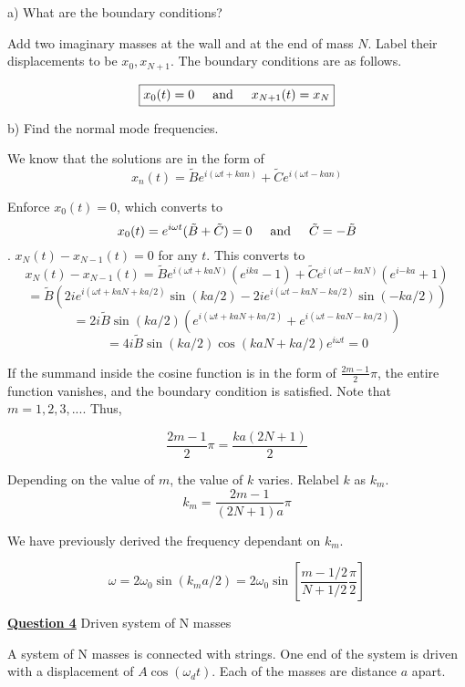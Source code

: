 \documentclass{article}
\newcommand{\new}[1]{
    \vspace{2mm}
    \noindent
    \textbf{
    \underline{#1}}
}
\newcommand{\textAnd}{
    {
        \hspace{5mm}
        \textrm{and}
        \hspace{5mm}
    }
}
\newcommand{\Ixp}[1]{
    {
        e^{i{#1}}
    }
}
\begin{document}
\noindent
a) What are the boundary conditions?

Add two imaginary masses at the wall and at the end of mass $N$. 
Label their displacements to be $x_0, x_{N+1}$. The boundary conditions 
are as follows.

\[
    \boxed{
    x_0(t) = 0 \textAnd x_{N+1}(t) = x_{N}
    }
\]

\noindent
b) Find the normal mode frequencies. 

We know that the solutions are in the form of 
\[
    x_n(t) = 
    \tilde{B} {
        \Ixp{(\omega t + k a n )}
    }
    +
    \tilde{C} {
        \Ixp{(\omega t - k a n)}
    }
\]

Enforce $x_0(t) = 0$, which converts to 
\[
    x_0(t) = \Ixp{
        \omega t
    }
    (\tilde{B} + \tilde{C}) = 0 
    \textAnd \tilde{C} = -\tilde{B}
\]. $x_N(t) - x_{N-1}(t) = 0$ for any $t$. This converts to 
\[
    x_N(t) - x_{N-1}(t) = 
    \tilde{B}\Ixp{(\omega t + kaN)}(
        \Ixp{ka} - 1
    )
    +
    \tilde{C}\Ixp{(\omega t - kaN)}(
        \Ixp{-ka} + 1
    )
\]
\[
    = \tilde{B} \left(
        2i\Ixp{(\omega t + kaN + ka/2)} \sin(ka/2) 
        - 2i\Ixp{(\omega t - kaN - ka/2)} \sin(-ka/2) 
    \right)
\]
\[
    = 2i\tilde{B} \sin(ka/2) 
    \left(
        \Ixp{(\omega t + kaN + ka/2)}
        + \Ixp{(\omega t - kaN - ka/2)}
    \right)
\]
\[
    = 4i \tilde{B} \sin(ka/2) \cos(kaN + ka/2) \Ixp{\omega t} = 0
\]

If the summand inside the cosine function is in the form of 
$\frac{2m - 1}{2} \pi$, the entire function vanishes, and the 
boundary condition is satisfied. Note that $m = {1, 2, 3, ...}$.  Thus, 

\[
    \frac{2m - 1}{2} \pi = 
    \frac{ka(2N + 1)}{2}
\]

Depending on the value of $m$, the value of $k$ varies. Relabel 
$k$ as $k_m$. 
\[
    k_m = \frac{2m - 1}{(2N + 1)a}\pi
\]

We have previously derived the frequency dependant on $k_m$. 

\[
    \boxed{
    \omega = 2\omega_0 \sin(k_m a/2) = 2\omega_0 \sin \left[
        \frac{m - 1/2}{N + 1/2} \frac{\pi}{2}
    \right]
    }
\]


\newpage

\new{Question 4} Driven system of N masses

A system of N masses is connected with strings. One end of the system 
is driven with a displacement of $A\cos(\omega_d t)$. Each of the masses 
are distance $a$ apart. 
\end{document}
